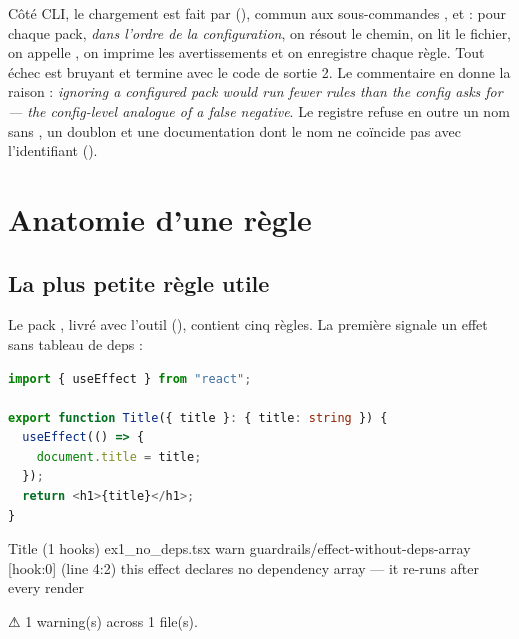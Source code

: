 Côté CLI, le chargement est fait par  (), commun aux sous-commandes ,  et  : pour chaque pack, \emph{dans l'ordre de la configuration}, on résout le chemin, on lit le fichier, on appelle , on imprime les avertissements et on enregistre chaque règle. Tout échec est bruyant et termine avec le code de sortie 2. Le commentaire en donne la raison : \og \emph{ignoring a configured pack would run fewer rules than the config asks for --- the config-level analogue of a false negative}\fg{}. Le registre refuse en outre un nom sans \code{/}, un doublon et une documentation dont le nom ne coïncide pas avec l'identifiant ().

\section{Anatomie d'une règle}
\label{sec:regles-declaratives-anatomie}

\subsection{La plus petite règle utile}

Le pack , livré avec l'outil (), contient cinq règles. La première signale un effet sans tableau de deps :



\begin{lstlisting}[language=TypeScript,caption={Un titre synchronisé après chaque rendu (\file{/tmp/ch22/ex1\_no\_deps.tsx})},label={lst:decl-ex1-tsx}]
import { useEffect } from "react";

export function Title({ title }: { title: string }) {
  useEffect(() => {
    document.title = title;
  });
  return <h1>{title}</h1>;
}
\end{lstlisting}

\begin{sortie}
  Title  (1 hooks)  ex1_no_deps.tsx
    warn   guardrails/effect-without-deps-array  [hook:0]  (line 4:2)  this effect declares no dependency array — it re-runs after every render

⚠  1 warning(s) across 1 file(s).
\end{sortie}

